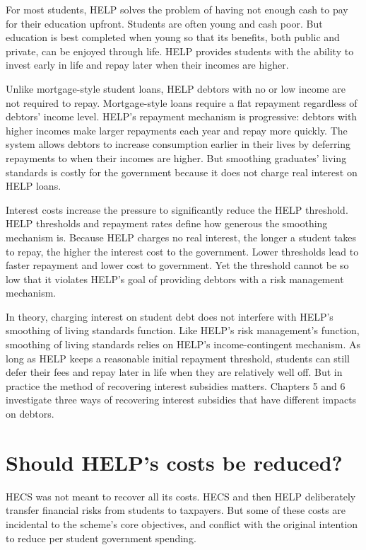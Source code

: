 \documentclass[embargoed]{grattan}
\begin{document}
For most students, HELP solves the problem of having not enough cash to pay for their education upfront.
Students are often young and cash poor.
But education is best completed when young so that its benefits, both public and private, can be enjoyed through life.
HELP provides students with the ability to invest early in life and repay later when their incomes are higher.

Unlike mortgage-style student loans, HELP debtors with no or low income are not required to repay.
Mortgage-style loans require a flat repayment regardless of debtors' income level.
HELP's repayment mechanism is progressive: debtors with higher incomes make larger repayments each year and repay more quickly.
The system allows debtors to increase consumption earlier in their lives by deferring repayments to when their incomes are higher.
But smoothing graduates' living standards is costly for the government because it does not charge real interest on HELP loans.

Interest costs increase the pressure to significantly reduce the HELP threshold.
HELP thresholds and repayment rates define how generous the smoothing mechanism is.
Because HELP charges no real interest, the longer a student takes to repay, the higher the interest cost to the government.
Lower thresholds lead to faster repayment and lower cost to government.
Yet the threshold cannot be so low that it violates HELP's goal of providing debtors with a risk management mechanism.

In theory, charging interest on student debt does not interfere with HELP's smoothing of living standards function.
Like HELP's risk management's function, smoothing of living standards relies on HELP's income-contingent mechanism.
As long as HELP keeps a reasonable initial repayment threshold, students can still defer their fees and repay later in life when they are relatively well off. \protect\hypertarget{_Ref435627338}{}{}But in practice the method of recovering interest subsidies matters.
Chapters 5 and 6 investigate three ways of recovering interest subsidies that have different impacts on debtors.

\section{Should HELP's costs be reduced?}\label{should-helps-costs-be-reduced}

HECS was not meant to recover all its costs.
HECS and then HELP deliberately transfer financial risks from students to taxpayers.
But some of these costs are incidental to the scheme's core objectives, and conflict with the original intention to reduce per student government spending.
\end{document}
